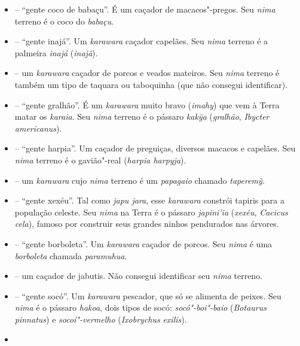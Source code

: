 \begin{itemize}
  \emph{} -- ``gente garrinchão''. Um \emph{karawara} caçador de
  macacos"-pregos. Seu \emph{nima} terreno é o pássaro \emph{txapej xoxo}
  (garrinchão"-pai"-avô, \emph{Pheugopedius genibarbis}).
\item
   -- ``gente coco de babaçu''. É um caçador de macacos"-pregos.
  Seu \emph{nima} terreno é o coco do \emph{babaçu}.
\item
   -- ``gente inajá''. Um \emph{karawara} caçador
  capelães. Seu \emph{nima} terreno é a palmeira \emph{inajá}
  (\emph{inajã}).
\item
  \emph{} -- um \emph{karawara} caçador de porcos e
  veados mateiros. Seu \emph{nima} terreno é também um tipo de taquara
  ou taboquinha (que não consegui identificar).
\item
  \emph{} -- ``gente gralhão''. É um \emph{karawara} muito bravo
  (\emph{imahy}) que vem à Terra matar os \emph{karaia}. Seu \emph{nima}
  terreno é o pássaro \emph{kakỹa} (\emph{gralhão}, \emph{Ibycter
  americanus}).
\item
  \emph{} -- ``gente harpia''. Um caçador de preguiças,
  diversos macacos e capelães. Seu \emph{nima} terreno é o gavião"-real
  (\emph{harpia harpyja}).
\item
  \emph{} -- um \emph{karawara} cujo \emph{nima}
  terreno é um \emph{papagaio} chamado \emph{taperemỹ}.
\item
  \emph{} -- ``gente xexéu''. Tal como \emph{japu jara}, esse
  \emph{karawara} constrói tapiris para a população celeste. Seu
  \emph{nima} na Terra é o pássaro \emph{japini'ia} (\emph{xexéu},
  \emph{Cacicus} \emph{cela}), famoso por construir seus grandes ninhos
  pendurados nas árvores.
\item
  \emph{} -- ``gente borboleta''. Um \emph{karawara} caçador de porcos. Seu
  \emph{nima} é uma \emph{borboleta} chamada \emph{paramuhua}.
\item
  \emph{} -- um caçador de jabutis. Não consegui
  identificar seu \emph{nima} terreno.
\item
   -- ``gente socó''. Um \emph{karawara} pescador, que só se
  alimenta de peixes. Seu \emph{nima} é o pássaro \emph{hakoa}, dois
  tipos de socó: \emph{socó"-boi"-baio} (\emph{Botaurus pinnatus}) e
  \emph{socoí"-vermelho} (\emph{Ixobrychus} \emph{exilis}).
\item

\end{itemize}
